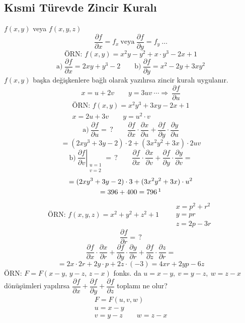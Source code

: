 \documentclass[11pt,a4paper]{article}
\begin{document}
\subsection{Kısmi Türevde Zincir Kuralı}
$f(x,y)$ veya $f(x,y,z)$
\[ \frac{\partial f}{\partial x}=f_x\ \text{veya}\ \frac{\partial f}{\partial y}=f_y\ \ldots \]
\[ \text{ÖRN: }f(x,y)=x^2y-y^2+x\cdot y^3-2x+1 \]
\[ \text{a)}\ \frac{\partial f}{\partial x}=2xy+y^3-2\qquad\text{b)}\ \frac{\partial f}{\partial y}=x^2-2y+3xy^2 \]
$f(x,y)$ başka değişkenlere bağlı olarak yazılırsa zincir kuralı uygulanır.
\[ x=u+2v\qquad y=3uv\ \cdots\Rightarrow\ \frac{\partial f}{\partial u} \]
\begin{gather*}
\text{ÖRN: }f(x,y)=x^2y^3+3xy-2x+1\\
x=2u+3v\qquad y=u^2\cdot v
\end{gather*}
\[ \text{a)}\ \frac{\partial f}{\partial u}=\,?\qquad\frac{\partial f}{\partial x}\cdot\frac{\partial x}{\partial u}+\frac{\partial f}{\partial y}\cdot\frac{\partial y}{\partial u} \]
\[ =(2xy^3+3y-2)\cdot2+(3x^2y^2+3x)\cdot2uv \]
\[ \text{b)}\ \left.\frac{\partial f}{\partial v}\right|_{\substack{u=1\\ v=2}}=\,?\qquad\frac{\partial f}{\partial x}\cdot\frac{\partial x}{\partial v}+\frac{\partial f}{\partial y}\cdot\frac{\partial y}{\partial v}= \]
\begin{gather*}
=(2xy^3+3y-2)\cdot3+(3x^2y^2+3x)\cdot u^2\\
=396+400=796\,\footnotemark
\end{gather*}
\[ \text{ÖRN: }f(x,y,z)=x^2+y^2+z^2+1\qquad\begin{array}{l}x=p^2+r^2\\ y=pr\\ z=2p-3r\end{array} \]
\[ \frac{\partial f}{\partial r}=\,? \]
\[ \frac{\partial f}{\partial x}\cdot\frac{\partial x}{\partial r}+\frac{\partial f}{\partial y}\cdot\frac{\partial y}{\partial r}+\frac{\partial f}{\partial z}\cdot\frac{\partial z}{\partial r}= \]
\[ =2x\cdot2r+2y\cdot p+2z\cdot(-3)=4xr+2yp-6z \]
ÖRN: $F=F(x-y,\,y-z,\,z-x)$ fonks. da $u=x-y,\ v=y-z,\ w=z-x$ dönüşümleri yapılırsa $\dfrac{\partial f}{\partial x}+\dfrac{\partial f}{\partial y}+\dfrac{\partial f}{\partial z}$ toplamı ne olur?
\[ \begin{array}{l}F=F(u,v,w)\\ u=x-y\\ v=y-z\qquad w=z-x\end{array} \]
\end{document}
